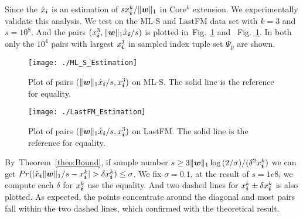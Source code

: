 \documentclass[10pt,journal,compsoc]{IEEEtran}
\newcommand{\V}[1]{{\boldsymbol{{\MakeLowercase{#1}}}}}
\newcommand{\predx}{\hat{x}_{\V{i}}}
\newcommand{\norm}[2]{\|#1\|_{#2}}
\newcommand{\Fig}[1]{Fig.~\ref{fig:#1}}
\newcommand{\Theo}[1]{Theorem~\ref{theo:#1}}
\begin{document}
Since the $\predx$ is an estimation of $sx^k_{\V{i}}/\norm{\V{w}}{1}$ in Core$^k$ extension. We experimentally validate this analysis. We test on the ML-S and LastFM data set with $k=3$ and $s=10^8$. And the pairs $(x^3_{\V{i}},\norm{\V{w}}{1}\hat{x}_{\V{i}}/s)$ is plotted in~\Fig{MLSEstimation} and ~\Fig{MLSEstimation}. In both only the $10^4$ pairs with largest $x^3_{\V{i}}$ in sampled index tuple set $\Psi_p$ are shown. 
\begin{figure}[!ht]
	\centering
	\texttt{[image: ./ML\_S\_Estimation]}\\
	\caption{Plot of pairs $(\norm{\V{w}}{1}\hat{x}_{\V{i}}/s,x^3_{\V{i}})$ on ML-S.
		The solid line is the reference for equality.}
	\label{fig:MLSEstimation}
\end{figure}
\begin{figure}[!ht]
	\centering
	\texttt{[image: ./LastFM\_Estimation]}\\
	\caption{Plot of pairs $(\norm{\V{w}}{1}\hat{x}_{\V{i}}/s,x^3_{\V{i}})$ on LastFM.
		The solid line is the reference for equality.}
	\label{fig:LastFMEstimation}
\end{figure}

By~\Theo{Bound}, if sample number $s \geq 3\norm{\V{w}}{1}\log{(2/\sigma)}/(\delta^2 x^k_{\V{i}})$ we can get $Pr(|\predx\norm{\V{W}}{1}/s - x^k_{\V{i}}| > \delta x^k_{\V{i}}) \leq \sigma$. We fix $\sigma=0.1$, at the result of $s=1e8$, we compute each $\delta$ for $x^k_{\V{i}}$ use the equality. And two dashed lines for $x^k_{\V{i}}\pm\delta x^k_{\V{i}}$ is also plotted. As expected, the points concentrate around the diagonal and most pairs fall within the two dashed lines, which confirmed with the theoretical result.



%
\end{document}
